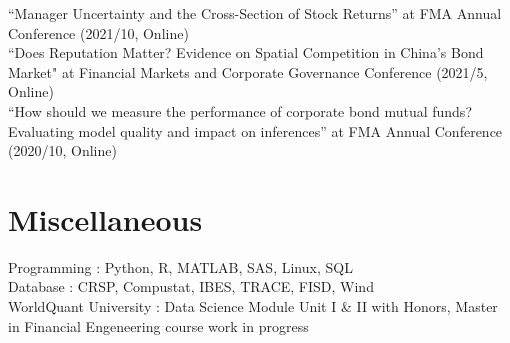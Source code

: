 \documentclass[margin]{res}
\begin{document}
\begin{resume}
``Manager Uncertainty and the Cross-Section of Stock Returns'' at FMA Annual Conference (2021/10, Online)
\\
``Does Reputation Matter? Evidence on Spatial Competition in China’s Bond Market" at Financial Markets and Corporate Governance Conference (2021/5, Online)
\\
``How should we measure the performance of corporate bond mutual funds? Evaluating model quality and impact on inferences'' at FMA Annual Conference (2020/10, Online)
\\

%


\section{\sc Miscellaneous}

Programming : Python, R, MATLAB, SAS, Linux, SQL
\\
Database : CRSP, Compustat, IBES, TRACE, FISD, Wind
\\
WorldQuant University : Data Science Module Unit I \& II with Honors, Master in Financial Engeneering course work in progress



\end{resume}
\(\)
\end{document}
